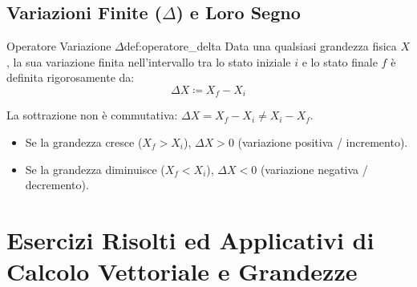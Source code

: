 \subsection{Variazioni Finite ($\Delta$) e Loro Segno}

\begin{definizione}{Operatore Variazione $\Delta$}{def:operatore_delta}
Data una qualsiasi grandezza fisica $X$, la sua variazione finita nell'intervallo tra lo stato iniziale $i$ e lo stato finale $f$ è definita rigorosamente da:
\begin{equation}
    \Delta X \coloneqq X_f - X_i
\end{equation}
\end{definizione}

\begin{esame}
La sottrazione non è commutativa: $\Delta X = X_f - X_i \neq X_i - X_f$.
\begin{itemize}
    \item Se la grandezza cresce ($X_f > X_i$), $\Delta X > 0$ (variazione positiva / incremento).
    \item Se la grandezza diminuisce ($X_f < X_i$), $\Delta X < 0$ (variazione negativa / decremento).
\end{itemize}
\end{esame}

\section{Esercizi Risolti ed Applicativi di Calcolo Vettoriale e Grandezze}
\label{sec:esercizi_capitolo_01}

